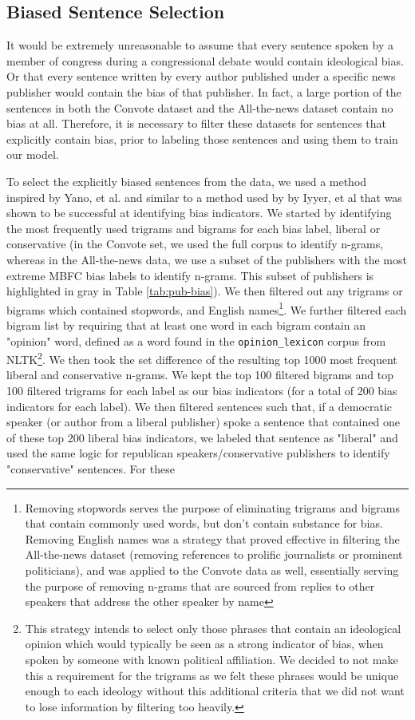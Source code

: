\documentclass[10pt,a4paper,onecolumn]{article}
\begin{document}
\subsection{Biased Sentence Selection}
\label{sec:filtering}
It would be extremely unreasonable to assume that every sentence spoken by a member of congress during a congressional debate would contain ideological bias. Or that every sentence written by every author published under a specific news publisher would contain the bias of that publisher. In fact, a large portion of the sentences in both the Convote dataset and the All-the-news dataset contain no bias at all. Therefore, it is necessary to filter these datasets for sentences that explicitly contain bias, prior to labeling those sentences and using them to train our model.

To select the explicitly biased sentences from the data, we used a method inspired by Yano, et al. \cite{YanoBigrams} and similar to a method used by by Iyyer, et al \cite{iyyerRNN} that was shown to be successful at identifying bias indicators. We started by identifying the most frequently used trigrams and bigrams for each bias label, liberal or conservative (in the Convote set, we used the full corpus to identify n-grams, whereas in the All-the-news data, we use a subset of the publishers with the most extreme MBFC bias labels to identify n-grams. This subset of publishers is highlighted in gray in Table \ref{tab:pub-bias}). We then filtered out any trigrams or bigrams which contained stopwords, and English names\footnote{Removing stopwords serves the purpose of eliminating trigrams and bigrams that contain commonly used words, but don't contain substance for bias. Removing English names was a strategy that proved effective in filtering the All-the-news dataset (removing references to prolific journalists or prominent politicians), and was applied to the Convote data as well, essentially serving the purpose of removing n-grams that are sourced from replies to other speakers that address the other speaker by name}. We further filtered each bigram list by requiring that at least one word in each bigram contain an "opinion" word, defined as a word found in the \texttt{opinion\_lexicon} corpus from NLTK\footnote{This strategy intends to select only those phrases that contain an ideological opinion which would typically be seen as a strong indicator of bias, when spoken by someone with known political affiliation. We decided to not make this a requirement for the trigrams as we felt these phrases would be unique enough to each ideology without this additional criteria that we did not want to lose information by filtering too heavily.}. We then took the set difference of the resulting top 1000 most frequent liberal and conservative n-grams. We kept the top 100 filtered bigrams and top 100 filtered trigrams for each label as our bias indicators (for a total of 200 bias indicators for each label). We then filtered sentences such that, if a democratic speaker (or author from a liberal publisher) spoke a sentence that contained one of these top 200 liberal bias indicators, we labeled that sentence as "liberal" and used the same logic for republican speakers/conservative publishers to identify "conservative" sentences. For these 
\end{document}

